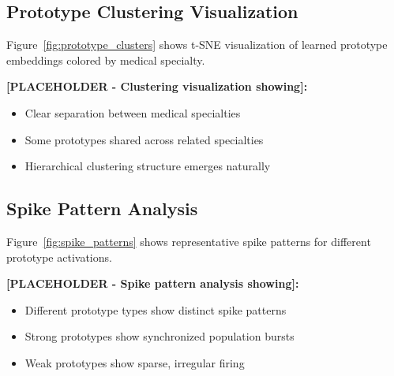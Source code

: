 \documentclass{article}
\begin{document}
\subsection{Prototype Clustering Visualization}

Figure~\ref{fig:prototype_clusters} shows t-SNE visualization of learned prototype embeddings colored by medical specialty.

\textbf{[PLACEHOLDER - Clustering visualization showing]:}
\begin{itemize}
\item Clear separation between medical specialties
\item Some prototypes shared across related specialties
\item Hierarchical clustering structure emerges naturally
\end{itemize}

\subsection{Spike Pattern Analysis}

Figure~\ref{fig:spike_patterns} shows representative spike patterns for different prototype activations.

\textbf{[PLACEHOLDER - Spike pattern analysis showing]:}
\begin{itemize}
\item Different prototype types show distinct spike patterns
\item Strong prototypes show synchronized population bursts
\item Weak prototypes show sparse, irregular firing
\end{itemize}
\end{document}
